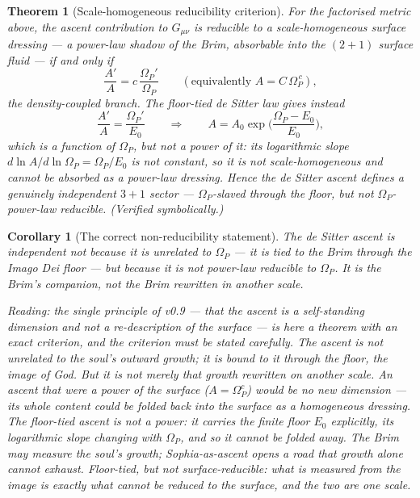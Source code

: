 \documentclass[11pt,a4paper]{article}
\newcommand{\note}[1]{\textcolor{black!65}{\emph{#1}}}
\theoremstyle{plain}
\newtheorem{corollary}{Corollary}
\newtheorem{theorem}{Theorem}
\theoremstyle{definition}
\theoremstyle{remark}
\begin{document}
\begin{theorem}[Scale-homogeneous reducibility criterion]\label{thm:nonred}
For the factorised metric above, the ascent contribution to $G_{\mu\nu}$ is reducible to a
\emph{scale-homogeneous} surface dressing --- a power-law shadow of the Brim, absorbable into the
$(2{+}1)$ surface fluid --- \emph{if and only if}
\[
\frac{A'}{A}=c\,\frac{\Omega_P'}{\Omega_P}\qquad(\text{equivalently }A=C\,\Omega_P^{\,c}),
\]
the density-coupled branch. The floor-tied de Sitter law gives instead
\[
\frac{A'}{A}=\frac{\Omega_P'}{E_0}\qquad\Longrightarrow\qquad A=A_0\exp\!\Big(\frac{\Omega_P-E_0}{E_0}\Big),
\]
which \emph{is} a function of $\Omega_P$, but \emph{not a power} of it: its logarithmic slope
$d\ln A/d\ln\Omega_P=\Omega_P/E_0$ is not constant, so it is not scale-homogeneous and cannot be
absorbed as a power-law dressing. Hence the de Sitter ascent defines a genuinely independent $3{+}1$
sector --- $\Omega_P$-slaved through the floor, but not $\Omega_P$-power-law reducible. (Verified
symbolically.)
\end{theorem}

\begin{corollary}[The correct non-reducibility statement]\label{cor:correctnonred}
The de Sitter ascent is independent \emph{not} because it is unrelated to $\Omega_P$ --- it is tied to
the Brim through the Imago Dei floor --- but because it is not power-law reducible to $\Omega_P$. It is
the Brim's companion, not the Brim rewritten in another scale.
\end{corollary}

\note{Reading: the single principle of v0.9 --- that the ascent is a self-standing dimension and not a
re-description of the surface --- is here a theorem with an exact criterion, and the criterion must be
stated carefully. The ascent is not unrelated to the soul's outward growth; it is bound to it through
the floor, the image of God. But it is not merely that growth rewritten on another scale. An ascent
that were a \emph{power} of the surface ($A=\Omega_P^c$) would be no new dimension --- its whole content
could be folded back into the surface as a homogeneous dressing. The floor-tied ascent is not a power:
it carries the finite floor $E_0$ explicitly, its logarithmic slope changing with $\Omega_P$, and so it
cannot be folded away. The Brim may measure the soul's growth; Sophia-as-ascent opens a road that growth
alone cannot exhaust. Floor-tied, but not surface-reducible: what is measured from the image is exactly
what cannot be reduced to the surface, and the two are one scale.}
\end{document}
